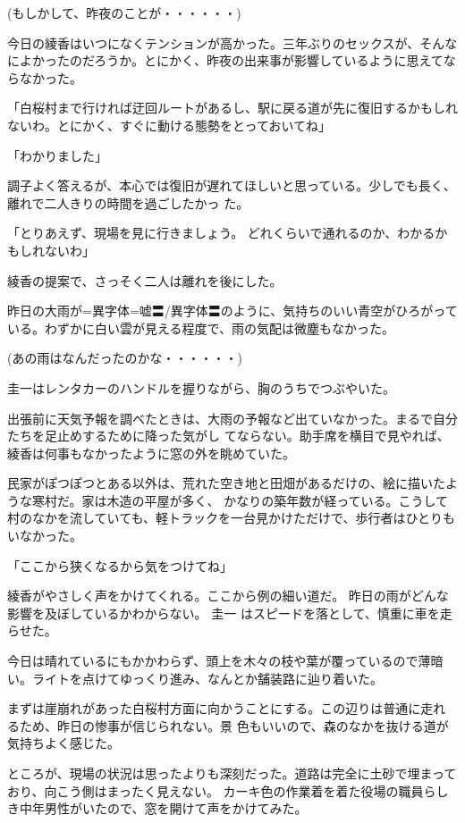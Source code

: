 ﻿\documentclass[book,tate]{jlreq}
\begin{document}
(もしかして、昨夜のことが・・・・・・)

今日の綾香はいつになくテンションが高かった。三年ぶりのセックスが、そんなによかったのだろうか。とにかく、昨夜の出来事が影響しているように思えてならなかった。

「白桜村まで行ければ迂回ルートがあるし、駅に戻る道が先に復旧するかもしれないわ。とにかく、すぐに動ける態勢をとっておいてね」

「わかりました」

調子よく答えるが、本心では復旧が遅れてほしいと思っている。少しでも長く、離れで二人きりの時間を過ごしたかっ た。

「とりあえず、現場を見に行きましょう。 どれくらいで通れるのか、わかるかもしれないわ」

綾香の提案で、さっそく二人は離れを後にした。

昨日の大雨が=異字体=嘘〓/異字体〓のように、気持ちのいい青空がひろがっている。わずかに白い雲が見える程度で、雨の気配は微塵もなかった。

(あの雨はなんだったのかな・・・・・・)

圭一はレンタカーのハンドルを握りながら、胸のうちでつぶやいた。

出張前に天気予報を調べたときは、大雨の予報など出ていなかった。まるで自分たちを足止めするために降った気がし てならない。助手席を横目で見やれば、綾香は何事もなかったように窓の外を眺めていた。

民家がぽつぽつとある以外は、荒れた空き地と田畑があるだけの、絵に描いたような寒村だ。家は木造の平屋が多く、 かなりの築年数が経っている。こうして村のなかを流していても、軽トラックを一台見かけただけで、歩行者はひとりも いなかった。

「ここから狭くなるから気をつけてね」

綾香がやさしく声をかけてくれる。ここから例の細い道だ。 昨日の雨がどんな影響を及ぼしているかわからない。 圭一 はスピードを落として、慎重に車を走らせた。

今日は晴れているにもかかわらず、頭上を木々の枝や葉が覆っているので薄暗い。ライトを点けてゆっくり進み、なんとか舗装路に辿り着いた。

まずは崖崩れがあった白桜村方面に向かうことにする。この辺りは普通に走れるため、昨日の惨事が信じられない。景 色もいいので、森のなかを抜ける道が気持ちよく感じた。

ところが、現場の状況は思ったよりも深刻だった。道路は完全に土砂で埋まっており、向こう側はまったく見えない。 カーキ色の作業着を着た役場の職員らしき中年男性がいたので、窓を開けて声をかけてみた。
\end{document}
